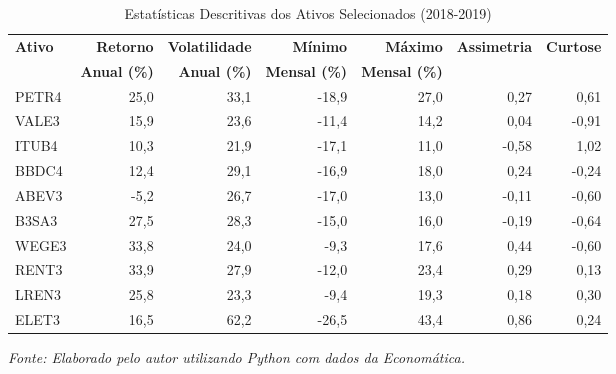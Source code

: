 \begin{table}[H]
\centering
\caption{Estatísticas Descritivas dos Ativos Selecionados (2018-2019)}
\begin{tabular}{|l|r|r|r|r|r|r|}
\hline
\textbf{Ativo} & \textbf{Retorno} & \textbf{Volatilidade} & \textbf{Mínimo} & \textbf{Máximo} & \textbf{Assimetria} & \textbf{Curtose} \\
& \textbf{Anual (\%)} & \textbf{Anual (\%)} & \textbf{Mensal (\%)} & \textbf{Mensal (\%)} & & \\
\hline
PETR4 & 25,0 & 33,1 & -18,9 & 27,0 & 0,27 & 0,61 \\
\hline
VALE3 & 15,9 & 23,6 & -11,4 & 14,2 & 0,04 & -0,91 \\
\hline
ITUB4 & 10,3 & 21,9 & -17,1 & 11,0 & -0,58 & 1,02 \\
\hline
BBDC4 & 12,4 & 29,1 & -16,9 & 18,0 & 0,24 & -0,24 \\
\hline
ABEV3 & -5,2 & 26,7 & -17,0 & 13,0 & -0,11 & -0,60 \\
\hline
B3SA3 & 27,5 & 28,3 & -15,0 & 16,0 & -0,19 & -0,64 \\
\hline
WEGE3 & 33,8 & 24,0 & -9,3 & 17,6 & 0,44 & -0,60 \\
\hline
RENT3 & 33,9 & 27,9 & -12,0 & 23,4 & 0,29 & 0,13 \\
\hline
LREN3 & 25,8 & 23,3 & -9,4 & 19,3 & 0,18 & 0,30 \\
\hline
ELET3 & 16,5 & 62,2 & -26,5 & 43,4 & 0,86 & 0,24 \\
\hline
\end{tabular}

\textit{Fonte: Elaborado pelo autor utilizando Python com dados da Economática.}
\label{tab:descriptive_stats}
\end{table}
